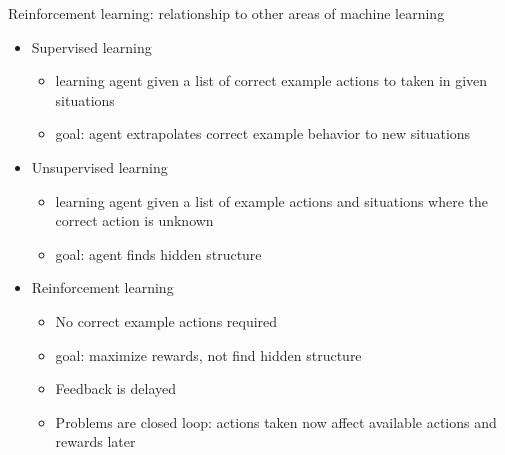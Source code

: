 \documentclass{beamer}
\begin{document}
%
%
%

\begin{frame}[c]{Reinforcement learning: relationship to other areas of machine learning}
\begin{itemize}[<+->]
  \item Supervised learning
  \begin{itemize}
    \item learning agent given a list of correct example actions to taken in given situations
    \item goal: agent extrapolates correct example behavior to new situations
  \end{itemize}
  \item Unsupervised learning
  \begin{itemize}
    \item learning agent given a list of example actions and situations where the correct action is unknown
    \item goal: agent finds hidden structure
  \end{itemize} 
  \item Reinforcement learning
\begin{itemize}
  \item No correct example actions required
  \item goal: maximize rewards, not find hidden structure
  \item Feedback is delayed 
  \item Problems are closed loop: actions taken now affect available actions and rewards later
\end{itemize} 
\end{itemize}
\end{frame}
\end{document}
